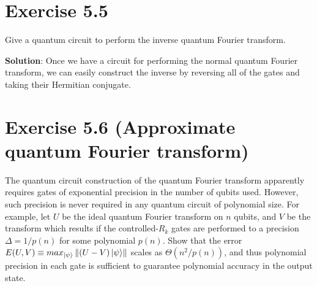 \documentclass{book}
\begin{document}
\section*{Exercise 5.5} 
    Give a quantum circuit to perform the inverse quantum Fourier transform.

    \textbf{Solution}: Once we have a circuit for performing the normal quantum Fourier transform, we can easily construct the inverse by reversing all of the gates and taking their Hermitian conjugate. 

\section*{Exercise 5.6 (Approximate quantum Fourier transform)}
    The quantum circuit construction of the quantum Fourier transform apparently requires gates of exponential precision in the number of qubits used. However, such precision is never required in any quantum circuit of polynomial size. For example, let $U$ be the ideal quantum Fourier transform on $n$ qubits, and $V$ be the transform which results if the controlled-$R_k$ gates are performed to a precision $\Delta = 1/p(n)$ for some polynomial $p(n)$. Show that the error $E(U, V) \equiv max_{\ket{\psi}} \left\|(U - V)\ket{\psi}\right\|$ scales as $\Theta(n^2/p(n))$, and thus polynomial precision in each gate is sufficient to guarantee polynomial accuracy in the output state.
\end{document}
